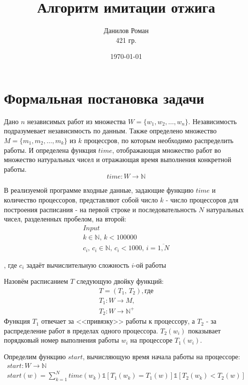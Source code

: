 \documentclass[a4paper,12pt]{article}
\author{Данилов Роман \\ 421 гр.}
\title{Алгоритм имитации отжига}
\date{\today}
\begin{document}
\maketitle

\section{Формальная постановка задачи}

Дано $n$ независимых работ из множества $W = \{w_1, w_2, \dots, w_n\}$.
Независимость подразумевает независимость по данным.
Также определено множество $M = \{m_1, m_2, \dots, m_k\}$ из $k$ процессров, по которым
необходимо распределить работы.
И определена функция $time$, отображающая множество работ во множество
натуральных чисел и отражающая время выполнения конкретной работы.
\[time: W \rightarrow \mathbb{N}\]

В реализуемой программе входные данные, задающие функцию $time$ и количество процессоров,
представляют собой число $k$ - число процессоров для построения расписания - на первой строке
и последовательность $N$ натуральных чисел, разделенных пробелом,
на второй:
\begin{gather*}
    Input \\ 
    k \in \mathbb{N}, \, k < 100000 \\
    c_i, \, c_i \in \mathbb{N}, \, c_i < 1000, \, i = \overline{1, N}
\end{gather*}

\noindent, где $c_i$ задаёт вычислительную сложность $i$-ой работы

\vspace{5pt}
Назовём расписанием $T$ следующую двойку функций:
\begin{gather*}
    T = (T_1, \, T_2), \text{где} \\
    T_1 : W \rightarrow M, \\
    T_2 : W \rightarrow \mathbb{N^+}
\end{gather*}
Функция $T_1$ отвечает за <<привязку>> работы к процессору, а $T_2$ - за
распределение работ в пределах одного процессора. $T_2(w_i)$ показывает порядковый номер выполнения
работы $w_i$ на процессоре $T_1(w_i)$.

Определим функцию $start$, вычисляющую время начала работы на процессоре:
\begin{gather*}
    start: W \rightarrow \mathbb{N} \\
    start(w) = \sum_{k=1}^{N} time(w_k) \mathds{1}[T_1(w_k)=T_1(w)] \mathds{1}[T_2(w_k)<T_2(w)]
\end{gather*}
\end{document}
